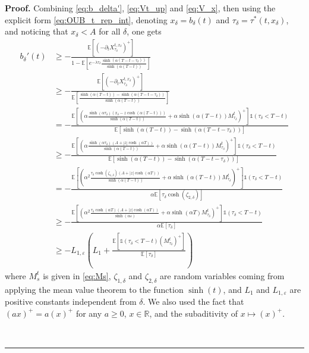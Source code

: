 \documentclass{tufte-handout}
\newcommand{\E}{\mathbb{E}} %
\newcommand{\R}{\mathbb{R}} %
\newenvironment{pf}[1][Proof]{\textbf{#1.} }{\ \rule{0.5em}{0.5em}}
\begin{document}
\begin{pf}
		Combining \eqref{eq:b_delta'}, \eqref{eq:Vt_up} and \eqref{eq:V_x}, then using the explicit form \eqref{eq:OUB_t_rep_int}, denoting $x_\delta = b_\delta(t)$ and $\tau_\delta = \tau^*(t, x_\delta)$, and noticing that $x_\delta < A$ for all $\delta$, one gets
		\begin{align}
		b_\delta'(t) &\geq -\displaystyle{\frac{\E\left[\left(-\partial_t X_{\tau_\delta}^{t, x_\delta}\right)^+\right]}{1 - \E\left[e^{-\lambda\tau_\delta}\frac{\sinh(\alpha (T - t - \tau_\delta))}{\sinh(\alpha (T - t))}\right]}} \nonumber \\
		&\geq -\frac{\E\left[\left(-\partial_t X_{\tau_\delta}^{t, x_\delta}\right)^+\right]}{\E\left[\frac{\sinh(\alpha(T - t)) - \sinh(\alpha (T - t - \tau_\delta))}{\sinh(\alpha (T - t))}\right]} \nonumber \\
		&= -\frac{\E\left[\left(\alpha\frac{\sinh(\alpha \tau_\delta)(x_\delta - z\cosh(\alpha(T - t)))}{\sinh(\alpha(T - t))} + \alpha\sinh(\alpha(T - t))M_{\tau_\delta}^t\right)^+\right]\mathbb{1}(\tau_\delta < T - t)}{\E\left[\sinh(\alpha(T - t)) - \sinh(\alpha (T - t - \tau_\delta))\right]} \nonumber \\
		&\geq -\frac{\E\left[\left(\alpha\frac{\sinh(\alpha \tau_\delta)(A + |z|\cosh(\alpha T))}{\sinh(\alpha(T - t))} + \alpha\sinh(\alpha(T - t))M_{\tau_\delta}^t\right)^+\right]\mathbb{1}(\tau_\delta < T - t)}{\E\left[\sinh(\alpha(T - t)) - \sinh(\alpha (T - t - \tau_\delta))\right]} \nonumber \\
		&= -\frac{\E\left[\left(\alpha^2\frac{\tau_\delta\cosh(\zeta_{1,\delta})(A + |z|\cosh(\alpha T))}{\sinh(\alpha(T - t))} + \alpha\sinh(\alpha(T - t))M_{\tau_\delta}^t\right)^+\right]\mathbb{1}(\tau_\delta < T - t)}{\alpha\E\left[\tau_\delta\cosh(\zeta_{2,\delta})\right]} \nonumber \\
		&\geq -\frac{\E\left[\left(\alpha^2\frac{\tau_\delta\cosh(\alpha T)(A + |z|\cosh(\alpha T))}{\sinh(\alpha \varepsilon)} + \alpha\sinh(\alpha T) M_{\tau_\delta}^t\right)^+\right]\mathbb{1}(\tau_\delta < T - t)}{\alpha\E\left[\tau_\delta\right]} \nonumber \\
		&\geq -L_{1,\varepsilon} \left(L_{1} + \frac{\E\left[\mathbb{1}(\tau_\delta < T - t)\left(M_{\tau_\delta}^t \right)^+\right]}{\E\left[\tau_\delta\right]}\right) \label{eq:b_delta'>}
		\end{align}
		where $M_s^t$ is given in \eqref{eq:Ms}, $\zeta_{1,\delta}$ and $\zeta_{2,\delta}$ are random variables coming from applying the mean value theorem to the function $\sinh(t)$, and $L_{1}$ and $L_{1, \varepsilon}$ are positive constants independent from $\delta$. We also used the fact that $(ax)^+ = a(x)^+$ for any $a\geq0$, $x\in\R$, and the subaditivity of $x\mapsto (x)^+$.
		

\end{pf}
\end{document}
